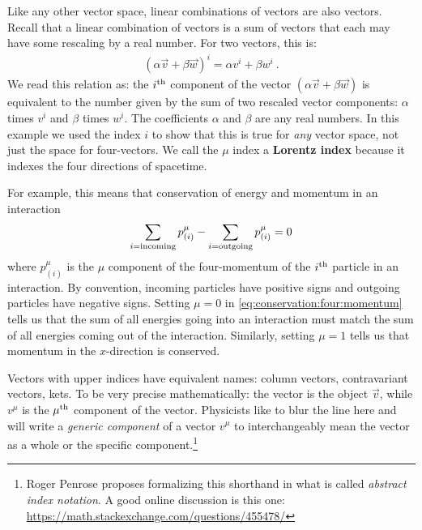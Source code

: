 \documentclass[12pt, oneside]{report}    %
\begin{document}
Like any other vector space, linear combinations of vectors are also vectors. Recall that a linear combination of vectors is a sum of vectors that each may have some rescaling by a real number. For two vectors, this is:
\begin{align}
   (\alpha\vec{v}+\beta\vec{w})^i = \alpha v^i + \beta w^i \ .
\end{align}
We read this relation as: the $i^\textnormal{th}$ component of the vector $(\alpha\vec{v}+\beta\vec{w})$ is equivalent to the number given by the sum of two rescaled vector components: $\alpha$ times $v^i$ and $\beta$ times $w^i$. The coefficients $\alpha$ and $\beta$ are any real numbers. In this example we used the index $i$ to show that this is true for \emph{any} vector space, not just the space for four-vectors. We call the $\mu$ index a \textbf{Lorentz index} because it indexes the four directions of spacetime.

\begin{example}
For example, this means that conservation of energy and momentum in an interaction
\begin{align}
    \sum_{i = \textnormal{incoming}} p_{(i)}^\mu -
    \sum_{i = \textnormal{outgoing}} p_{(i)}^\mu = 0
    \label{eq:conservation:four:momentum}
\end{align}
where $p_{(i)}^\mu$ is the $\mu$ component of the four-momentum of the $i^\textnormal{th}$ particle in an interaction. By convention, incoming particles have positive signs and outgoing particles have negative signs.  Setting $\mu=0$ in \eqref{eq:conservation:four:momentum} tells us that the sum of all energies going into an interaction must match the sum of all energies coming out of the interaction. Similarly, setting $\mu=1$ tells us that momentum in the $x$-direction is conserved. 
\end{example}


Vectors with upper indices have equivalent names: column vectors, contravariant vectors, kets. To be very precise mathematically: the vector is the object $\vec{v}$, while $v^\mu$ is the $\mu^\textnormal{th}$ component of the vector. Physicists like to blur the line here and will write a \emph{generic component} of a vector $v^\mu$ to interchangeably mean the vector as a whole or the specific component.\footnote{Roger Penrose proposes formalizing this shorthand in what is called \emph{abstract index notation}. A good online discussion is this one: \url{https://math.stackexchange.com/questions/455478/}}
\end{document}
